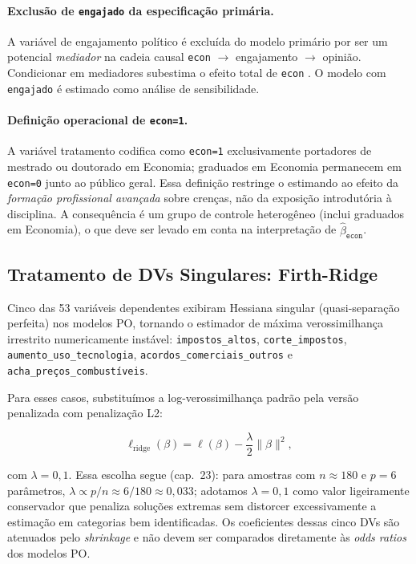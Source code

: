 \paragraph{Exclusão de \texttt{engajado} da especificação primária.}
A variável de engajamento político é excluída do modelo primário por ser um potencial \textit{mediador} na cadeia causal \texttt{econ} $\to$ engajamento $\to$ opinião. Condicionar em mediadores subestima o efeito total de \texttt{econ} \cite{angrist2009}. O modelo com \texttt{engajado} é estimado como análise de sensibilidade.

\paragraph{Definição operacional de \texttt{econ=1}.}
A variável tratamento codifica como \texttt{econ=1} exclusivamente portadores de mestrado ou doutorado em Economia; graduados em Economia permanecem em \texttt{econ=0} junto ao público geral. Essa definição restringe o estimando ao efeito da \emph{formação profissional avançada} sobre crenças, não da exposição introdutória à disciplina. A consequência é um grupo de controle heterogêneo (inclui graduados em Economia), o que deve ser levado em conta na interpretação de $\hat{\beta}_{\texttt{econ}}$.

\subsection{Tratamento de DVs Singulares: Firth-Ridge}\label{sec:firth-ridge}

Cinco das 53 variáveis dependentes exibiram Hessiana singular (quasi-separação perfeita) nos modelos PO, tornando o estimador de máxima verossimilhança irrestrito numericamente instável:
\texttt{impostos\_altos}, \texttt{corte\_impostos}, \texttt{aumento\_uso\_tecnologia}, \texttt{acordos\_comerciais\_outros} e \texttt{acha\_preços\_combustíveis}.

Para esses casos, substituímos a log-verossimilhança padrão pela versão penalizada com penalização L2:

\begin{equation}\label{eq:firth_ridge}
\ell_{\text{ridge}}(\beta) = \ell(\beta) - \frac{\lambda}{2}\|\beta\|^2,
\end{equation}

com $\lambda = 0{,}1$. Essa escolha segue  (cap.~23): para amostras com $n \approx 180$ e $p = 6$ parâmetros, $\lambda \propto p/n \approx 6/180 \approx 0{,}033$; adotamos $\lambda = 0{,}1$ como valor ligeiramente conservador que penaliza soluções extremas sem distorcer excessivamente a estimação em categorias bem identificadas. Os coeficientes dessas cinco DVs são atenuados pelo \textit{shrinkage} e não devem ser comparados diretamente às \textit{odds ratios} dos modelos PO.

